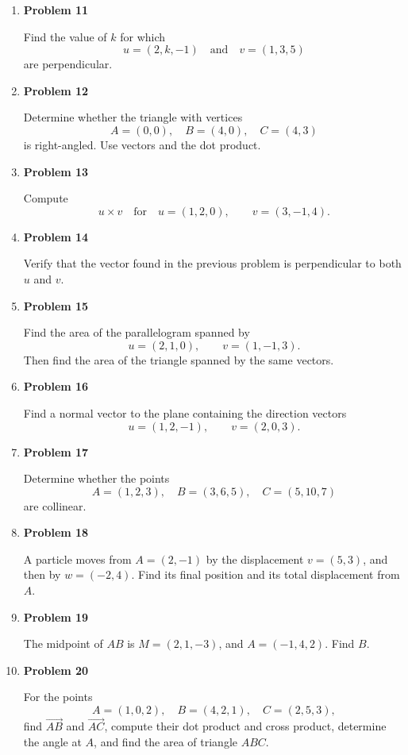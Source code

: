 \begin{enumerate}
\item \textbf{Problem 11}\par
Find the value of \(k\) for which
\[
u=(2,k,-1)
\quad\text{and}\quad
v=(1,3,5)
\]
are perpendicular.

\item \textbf{Problem 12}\par
Determine whether the triangle with vertices
\[
A=(0,0),\quad B=(4,0),\quad C=(4,3)
\]
is right-angled. Use vectors and the dot product.

\item \textbf{Problem 13}\par
Compute
\[
u\times v
\quad\text{for}\quad
u=(1,2,0),
\qquad
v=(3,-1,4).
\]

\item \textbf{Problem 14}\par
Verify that the vector found in the previous problem is perpendicular to both \(u\) and \(v\).

\item \textbf{Problem 15}\par
Find the area of the parallelogram spanned by
\[
u=(2,1,0),
\qquad
v=(1,-1,3).
\]
Then find the area of the triangle spanned by the same vectors.

\item \textbf{Problem 16}\par
Find a normal vector to the plane containing the direction vectors
\[
u=(1,2,-1),
\qquad
v=(2,0,3).
\]

\item \textbf{Problem 17}\par
Determine whether the points
\[
A=(1,2,3),\quad B=(3,6,5),\quad C=(5,10,7)
\]
are collinear.

\item \textbf{Problem 18}\par
A particle moves from \(A=(2,-1)\) by the displacement \(v=(5,3)\), and then by \(w=(-2,4)\). Find its final position and its total displacement from \(A\).

\item \textbf{Problem 19}\par
The midpoint of \(AB\) is \(M=(2,1,-3)\), and \(A=(-1,4,2)\). Find \(B\).

\item \textbf{Problem 20}\par
For the points
\[
A=(1,0,2),\quad B=(4,2,1),\quad C=(2,5,3),
\]
find \(\overrightarrow{AB}\) and \(\overrightarrow{AC}\), compute their dot product and cross product, determine the angle at \(A\), and find the area of triangle \(ABC\).
\end{enumerate}

